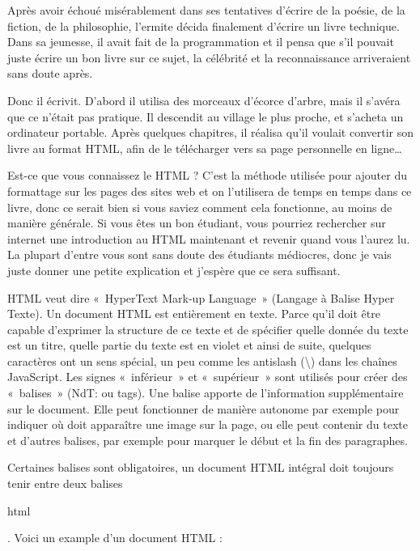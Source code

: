 \documentclass{FramateX}
\renewcommand{\texttt}[1]{\begin{sffamily}{#1}\end{sffamily}}
\begin{document}
Après avoir échoué misérablement dans ses tentatives d'écrire de la
poésie, de la fiction, de la philosophie, l'ermite décida finalement
d'écrire un livre technique. Dans sa jeunesse, il avait fait de la
programmation et il pensa que s'il pouvait juste écrire un bon livre sur
ce sujet, la célébrité et la reconnaissance arriveraient sans doute
après.

Donc il écrivit. D'abord il utilisa des morceaux d'écorce d'arbre, mais
il s'avéra que ce n'était pas pratique. Il descendit au village le plus
proche, et s'acheta un ordinateur portable. Après quelques chapitres, il
réalisa qu'il voulait convertir son livre au format HTML, afin de le
télécharger vers sa page personnelle en ligne\ldots{}

\begin{center}\end{center}

Est-ce que vous connaissez le HTML ? C'est la méthode utilisée pour
ajouter du formattage sur les pages des sites web et on l'utilisera de
temps en temps dans ce livre, donc ce serait bien si vous saviez comment
cela fonctionne, au moins de manière générale. Si vous êtes un bon
étudiant, vous pourriez rechercher sur internet une introduction au HTML
maintenant et revenir quand vous l'aurez lu. La plupart d'entre vous
sont sans doute des étudiants médiocres, donc je vais juste donner une
petite explication et j'espère que ce sera suffisant.

HTML veut dire «~HyperText Mark-up Language~» (Langage à Balise Hyper
Texte). Un document HTML est entièrement en texte. Parce qu'il doit être
capable d'exprimer la structure de ce texte et de spécifier quelle
donnée du texte est un titre, quelle partie du texte est en violet et
ainsi de suite, quelques caractères ont un sens spécial, un peu comme
les antislash (\textbackslash{}) dans les chaînes JavaScript. Les signes
«~inférieur~» et «~supérieur~» sont utilisés pour créer des «~balises~»
(NdT: ou tags). Une balise apporte de l'information supplémentaire sur
le document. Elle peut fonctionner de manière autonome par exemple pour
indiquer où doit apparaître une image sur la page, ou elle peut contenir
du texte et d'autres balises, par exemple pour marquer le début et la
fin des paragraphes.

Certaines balises sont obligatoires, un document HTML intégral doit
toujours tenir entre deux balises \texttt{html}. Voici un example d'un
document HTML :
\end{document}
